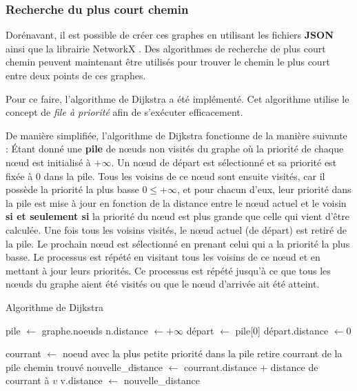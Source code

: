 \documentclass[journal, a4paper]{IEEEtran}
\begin{document}
\vspace{0.5cm}

\subsubsection{Recherche du plus court chemin}

Dorénavant, il est possible de créer ces graphes en utilisant les fichiers 
\textbf{JSON} ainsi que la librairie NetworkX \cite{networkx}. Des algorithmes de recherche de plus court chemin peuvent maintenant être utilisés pour trouver le chemin le plus court entre deux points de ces graphes.

Pour ce faire, l'algorithme de Dijkstra a été implémenté. Cet algorithme 
utilise le concept de \textit{file à priorité} afin de s'exécuter efficacement.

De manière simplifiée, l'algorithme de Dijkstra fonctionne de la manière suivante : 
Étant donné une \textbf{pile} de nœuds non visités du graphe où la priorité de chaque nœud est initialisé à $+\infty$.
Un nœud de départ est sélectionné et sa priorité est fixée à 0 dans la pile. Tous les voisins de ce nœud sont ensuite visités, car il possède la priorité la plus basse $0 \le + \infty$,
et pour chacun d'eux, leur priorité dans la pile est mise à jour en fonction de la distance entre le nœud actuel et le voisin \textbf{si et seulement si} la priorité du nœud est plus grande que celle qui vient d'être calculée. 
Une fois tous les voisins visités, le nœud actuel (de départ) est retiré de la pile.
Le prochain nœud est sélectionné en prenant celui qui a la priorité la plus basse. Le processus est répété en visitant tous les voisins de ce nœud et en mettant à jour leurs priorités. Ce processus est répété jusqu'à ce que tous les nœuds du graphe aient été visités ou que le nœud d'arrivée ait été atteint.

\begin{algorithm}
\caption{Algorithme de Dijkstra}
\begin{algorithmic}[1]
\State pile $\gets$ graphe.noeuds 
    \State n.distance $\gets + \infty$ 
\EndFor
\State départ $\gets$ pile[0]
\State départ.distance $\gets 0$

    \State courrant $\gets$ noeud avec la plus petite priorité dans la pile
    \State retire courrant de la pile
        \State \Return chemin trouvé
    \EndIf
        \State nouvelle\_distance $\gets$ courrant.distance $+$ distance de courrant à $v$
            \State v.distance $\gets$ nouvelle\_distance
        \EndIf
    \EndFor
    
\EndWhile


\end{algorithmic}
\end{algorithm}
\end{document}
